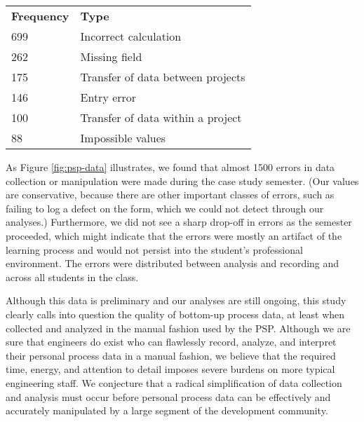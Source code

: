 \par


\begin{figure*}[h]
\begin{center}
\begin{tabular}{ll}
{\bf Frequency} & {\bf Type} \\
699 & Incorrect calculation \\
262 & Missing field \\
175 & Transfer of data between projects\\
146 & Entry error\\
100 & Transfer of data within a project\\
88  & Impossible values\\
\end{tabular} 
 \caption{{\em Summary statistics for error frequency and type in a PSP class}}
 \label{fig:psp-data}
\end{center}
\end{figure*}


\par

As Figure \ref{fig:psp-data} illustrates, we found that almost 1500 errors
in data collection or manipulation were made during the case study
semester.  (Our values are conservative, because there are other important
classes of errors, such as failing to log a defect on the form, which we
could not detect through our analyses.)  Furthermore, we did not see a
sharp drop-off in errors as the semester proceeded, which might indicate
that the errors were mostly an artifact of the learning process and would
not persist into the student's professional environment. The errors were
distributed between analysis and recording and across all students in the
class. 

Although this data is preliminary and our analyses are still ongoing, this
study clearly calls into question the quality of bottom-up process data, at
least when collected and analyzed in the manual fashion used by the PSP.
Although we are sure that engineers do exist who can flawlessly record,
analyze, and interpret their personal process data in a manual fashion, we
believe that the required time, energy, and attention to detail imposes
severe burdens on more typical engineering staff.  We conjecture that a
radical simplification of data collection and analysis must occur before
personal process data can be effectively and accurately manipulated by a
large segment of the development community.












